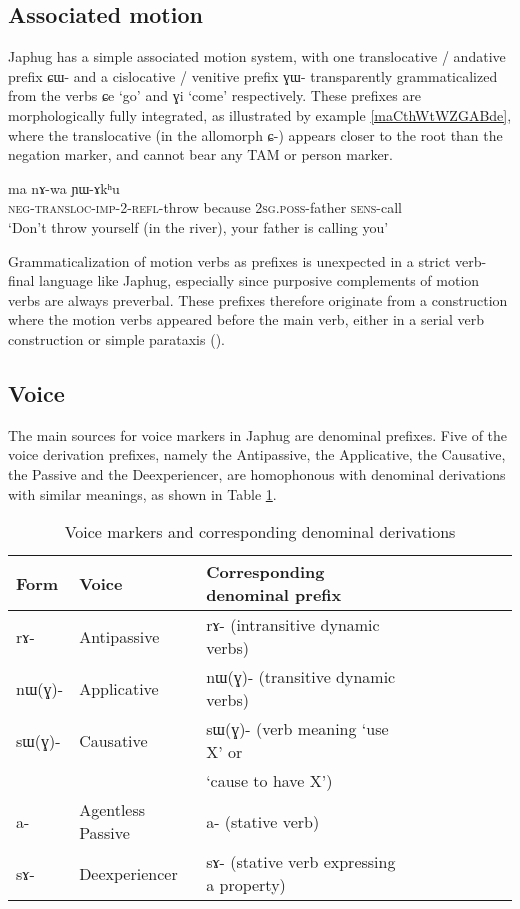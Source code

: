 \documentclass[oldfontcommands,oneside,a4paper,11pt]{article}
\newcommand{\ipa}[1]{{\phon #1}} %
\begin{document}
 

\subsection{Associated motion}
Japhug has a simple associated motion system, with one translocative / andative prefix \ipa{ɕɯ-} and a cislocative / venitive prefix \ipa{ɣɯ-} transparently grammaticalized from the verbs \ipa{ɕe} `go' and \ipa{ɣi} `come' respectively. These prefixes are morphologically fully integrated, as illustrated by example \ref{maCthWtWZGABde}, where the translocative (in the allomorph \ipa{ɕ-}) appears closer to the root than the negation marker, and cannot bear any TAM or person marker.

\begin{exe}
\ex \label{maCthWtWZGABde}
\gll \ipa{ma-ɕ-tʰɯ-tɯ-ʑɣɤ-βde} 	\ipa{ma} 	\ipa{nɤ-wa} 	\ipa{ɲɯ-ɤkʰu}   \\
\textsc{neg-transloc-imp-2-refl}-throw because \textsc{2sg.poss}-father \textsc{sens}-call \\
\glt `Don't throw yourself (in the river), your father is calling you' 
\end{exe}

Grammaticalization of motion verbs as prefixes is unexpected in a strict verb-final language like Japhug, especially since purposive complements of motion verbs are always preverbal. These prefixes therefore originate from a construction where the motion verbs appeared before the main verb, either in a serial verb construction or simple parataxis (\citealt{jacques13harmonization}).

\subsection{Voice}
The main sources for voice markers in Japhug are denominal prefixes. Five of the voice derivation prefixes, namely the Antipassive, the Applicative, the Causative, the Passive and the Deexperiencer, are homophonous with denominal derivations with similar meanings, as shown in Table \ref{tab:denom}.

\begin{table}[H] \caption{Voice markers and corresponding denominal derivations} \label{tab:denom} \centering
\begin{tabular}{lllllllll} \toprule
Form& Voice & Corresponding denominal prefix \\
\midrule
\ipa{rɤ}- & Antipassive &    \ipa{rɤ}- (intransitive dynamic verbs)\\
\ipa{nɯ(ɣ)}- & Applicative &    \ipa{nɯ(ɣ)}- (transitive dynamic verbs)\\
\ipa{sɯ(ɣ)}- & Causative &    \ipa{sɯ(ɣ)}- (verb meaning `use X' or \\
&& `cause to have X') \\
\ipa{a}- & Agentless Passive &    \ipa{a}- (stative verb)\\
\ipa{sɤ}-  & Deexperiencer &    \ipa{sɤ}- (stative verb expressing a property)\\
    \bottomrule
\end{tabular}
\end{table}
\end{document}

